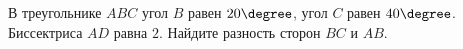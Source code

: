 \begin{ex}
	\begin{condition}
		В треугольнике \( ABC  \) угол \( B \) равен \( 20\degree \), угол \( C \) равен \( 40\degree \). Биссектриса \( AD  \) равна \( 2  \). Найдите разность сторон \( BC  \) и \( AB \).
	\end{condition}
\end{ex}
